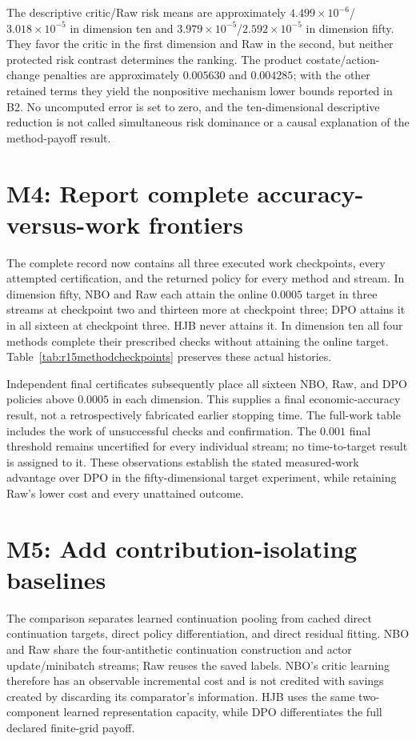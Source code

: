 The descriptive critic/Raw risk means are approximately $4.499\times10^{-6}$/$3.018\times10^{-5}$ in dimension ten and $3.979\times10^{-5}$/$2.592\times10^{-5}$ in dimension fifty. They favor the critic in the first dimension and Raw in the second, but neither protected risk contrast determines the ranking. The product costate/action-change penalties are approximately $0.005630$ and $0.004285$; with the other retained terms they yield the nonpositive mechanism lower bounds reported in B2. No uncomputed error is set to zero, and the ten-dimensional descriptive reduction is not called simultaneous risk dominance or a causal explanation of the method-payoff result.

\section*{M4: Report complete accuracy-versus-work frontiers}
The complete record now contains all three executed work checkpoints, every attempted certification, and the returned policy for every method and stream. In dimension fifty, NBO and Raw each attain the online $0.0005$ target in three streams at checkpoint two and thirteen more at checkpoint three; DPO attains it in all sixteen at checkpoint three. HJB never attains it. In dimension ten all four methods complete their prescribed checks without attaining the online target. Table~\ref{tab:r15methodcheckpoints} preserves these actual histories.

Independent final certificates subsequently place all sixteen NBO, Raw, and DPO policies above $0.0005$ in each dimension. This supplies a final economic-accuracy result, not a retrospectively fabricated earlier stopping time. The full-work table includes the work of unsuccessful checks and confirmation. The $0.001$ final threshold remains uncertified for every individual stream; no time-to-target result is assigned to it. These observations establish the stated measured-work advantage over DPO in the fifty-dimensional target experiment, while retaining Raw's lower cost and every unattained outcome.

\section*{M5: Add contribution-isolating baselines}
The comparison separates learned continuation pooling from cached direct continuation targets, direct policy differentiation, and direct residual fitting. NBO and Raw share the four-antithetic continuation construction and actor update/minibatch streams; Raw reuses the saved labels. NBO's critic learning therefore has an observable incremental cost and is not credited with savings created by discarding its comparator's information. HJB uses the same two-component learned representation capacity, while DPO differentiates the full declared finite-grid payoff.

